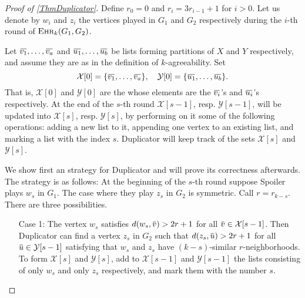 \documentclass[12pt,notitlepage,a4paper]{article}
\theoremstyle{definition}
\newcommand{\overbar}[1]{\mkern 1.5mu\overline{\mkern-1.5mu#1\mkern-1.5mu}\mkern 1.5mu}
\newcommand{\ehr}{\textsc{Ehr}}
\begin{document}
\begin{proof}[Proof of \cref{ThmDuplicator}]
	Define $r_0=0$ and $r_i=3r_{i-1}+1$ for $i>0$.
	Let us denote by $w_i$ and $z_i$ the vertices played
	in $G_1$ and $G_2$ respectively during the $i$-th
	round of $\ehr_k(G_1,G_2)$. 
	\par
	
	Let $\overbar{v_1},\dots,\overbar{v_a}$ and 
	$\overbar{u_1},\dots,\overbar{u_b}$ be lists
	forming partitions of 
	$X$ and $Y$ respectively, and assume they
	are as in the definition of $k$-agreeability.
	Set 
	\[\mathcal{X}[0]=\{\overbar{v_1},\dots,\overbar{v_a}\},
	\quad \mathcal{Y}[0]=\{\overbar{u_1},\dots,\overbar{u_b}\}.\]
	That is, $\mathcal{X}[0]$ and $\mathcal{Y}[0]$ are the whose elements
	are the $\overbar{v_i}$'s and $\overbar{u_i}$'s respectively. 
	At the end of the $s$-th round $\mathcal{X}[s-1]$,
	resp. $\mathcal{Y}[s-1]$, will be updated into 
	$\mathcal{X}[s]$,
	resp. $\mathcal{Y}[s]$, by performing on it
	some of the following operations: adding a new list
	to it, appending one vertex to an existing list, and 
	marking a list with the index $s$. Duplicator will
	keep track of the sets $\mathcal{X}[s]$ and $\mathcal{Y}[s]$.\par
	
	We show first an strategy for Duplicator and will prove its
	correctness afterwards. The strategy is as follows: At the 
	beginning of the $s$-th round suppose Spoiler plays $w_s$ in
	$G_1$. The case where they play $z_s$ in $G_2$ is symmetric.
	Call $r=r_{k-s}$. There are three possibilities. 
	\begin{itemize}
		\item[Case 1:] The vertex $w_s$ satisfies
		$d(w_s,\overbar{v})>2r+1$ for all 
		$\overbar{v}\in \mathcal{X}[s-1]$. Then Duplicator 
		can find a vertex $z_s$ in $G_2$ such that
		$d(z_s,\overbar{u})>2r+1$ for all 
		$\overbar{u}\in \mathcal{Y}[s-1]$ satisfying 
		that $w_s$ and $z_s$ have $(k-s)$-similar
		$r$-neighborhoods. To form $ \mathcal{X}[s]$
		and $ \mathcal{Y}[s]$, add to $\mathcal{X}[s-1]$
		and $ \mathcal{Y}[s-1]$ the lists consisting
		of only $w_s$ and only $z_s$ respectively, and mark
		them with the number $s$.
		

\end{itemize}
\end{proof}
\end{document}
